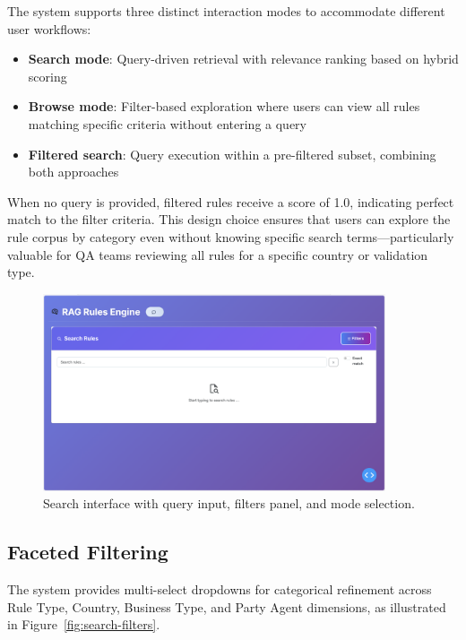 The system supports three distinct interaction modes to accommodate different user workflows:

\begin{itemize}[leftmargin=*,itemsep=2pt,topsep=2pt]
  \item \textbf{Search mode}: Query-driven retrieval with relevance ranking based on hybrid scoring
  \item \textbf{Browse mode}: Filter-based exploration where users can view all rules matching specific criteria without entering a query
  \item \textbf{Filtered search}: Query execution within a pre-filtered subset, combining both approaches
\end{itemize}

When no query is provided, filtered rules receive a score of 1.0, indicating perfect match to the filter criteria. This design choice ensures that users can explore the rule corpus by category even without knowing specific search terms—particularly valuable for QA teams reviewing all rules for a specific country or validation type.

\begin{figure}[!htbp]
\centering
\includegraphics[width=0.9\textwidth]{Figures/full_search.png}
\caption{Search interface with query input, filters panel, and mode selection.}
\label{fig:search-interface}
\end{figure}

\subsection{Faceted Filtering}

The system provides multi-select dropdowns for categorical refinement across Rule Type, Country, Business Type, and Party Agent dimensions, as illustrated in Figure~\ref{fig:search-filters}.

